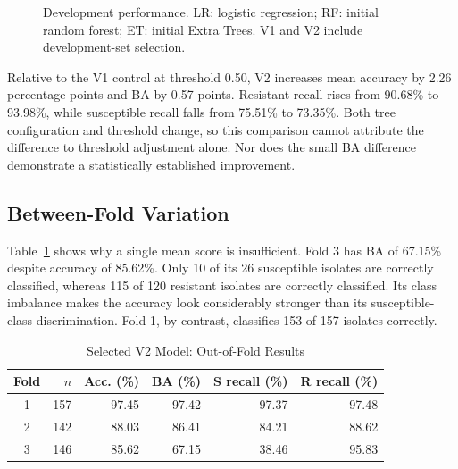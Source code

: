\documentclass[conference]{IEEEtran}
\begin{document}
\begin{figure}[t]
\centering
{}
\caption{Development performance. LR: logistic regression; RF: initial random forest; ET: initial Extra Trees. V1 and V2 include development-set selection.}
\label{fig:bar}
\end{figure}

Relative to the V1 control at threshold 0.50, V2 increases mean accuracy by 2.26 percentage points and BA by 0.57 points. Resistant recall rises from 90.68\% to 93.98\%, while susceptible recall falls from 75.51\% to 73.35\%. Both tree configuration and threshold change, so this comparison cannot attribute the difference to threshold adjustment alone. Nor does the small BA difference demonstrate a statistically established improvement.

\subsection{Between-Fold Variation}
Table~\ref{tab:folds} shows why a single mean score is insufficient. Fold 3 has BA of 67.15\% despite accuracy of 85.62\%. Only 10 of its 26 susceptible isolates are correctly classified, whereas 115 of 120 resistant isolates are correctly classified. Its class imbalance makes the accuracy look considerably stronger than its susceptible-class discrimination. Fold 1, by contrast, classifies 153 of 157 isolates correctly.

\begin{table}[t]
\caption{Selected V2 Model: Out-of-Fold Results}
\label{tab:folds}
\centering\footnotesize
\begin{tabular}{crrrrr}\toprule
Fold & $n$ & Acc. (\%) & BA (\%) & S recall (\%) & R recall (\%)\\\midrule
1&157&97.45&97.42&97.37&97.48\\
2&142&88.03&86.41&84.21&88.62\\
3&146&85.62&67.15&38.46&95.83\\\bottomrule
\end{tabular}
\end{table}
\end{document}
